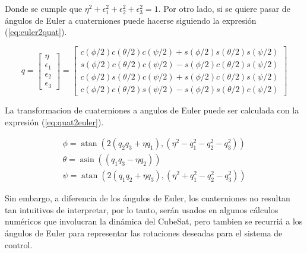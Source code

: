 Donde se cumple que $\eta^2 + \epsilon_1^2+ \epsilon_2^2+ \epsilon_3^2 =1 $. Por otro lado, si se quiere pasar de ángulos de Euler a cuaterniones puede hacerse siguiendo la expresión (\ref{eq:euler2quat}).

\begin{equation}
q=\left[\begin{array}{c}
	\eta \\
	\epsilon_1 \\
	\epsilon_2 \\
	\epsilon_3
\end{array}\right]=\left[\begin{array}{l}
	c(\phi / 2) c(\theta / 2) c(\psi / 2)+s(\phi / 2) s(\theta / 2) s(\psi / 2) \\
	s(\phi / 2) c(\theta / 2) c(\psi / 2)-s(\phi / 2) c(\theta / 2) s(\psi / 2) \\
	c(\phi / 2) s(\theta / 2) c(\psi / 2)+s(\phi / 2) c(\theta / 2) s(\psi / 2) \\
	c(\phi / 2) c(\theta / 2) s(\psi / 2)-s(\phi / 2) s(\theta / 2) c(\psi / 2)
\end{array}\right]\label{eq:euler2quat}
\end{equation}


La transformacion de cuaterniones a angulos de Euler puede ser calculada con la expresión (\ref{eq:quat2euler}).

\begin{equation}
	\begin{gathered}
		\phi=\operatorname{atan}\left(2\left(q_2 q_3+\eta q_1\right),\left(\eta^2-q_1^2-q_2^2-q_3^2\right)\right) \\
		\theta=\operatorname{asin}\left(\left(q_1 q_3-\eta q_2\right)\right) \\
		\psi=\operatorname{atan}\left(2\left(q_1 q_2+\eta q_3\right),\left(\eta^2+q_1^2-q_2^2-q_3^2\right)\right)
	\end{gathered}\label{eq:quat2euler}
\end{equation}

Sin embargo, a diferencia de los ángulos de Euler, los cuaterniones no resultan tan intuitivos de interpretar, por lo tanto, serán usados en algunos cálculos numéricos que involucran la dinámica del CubeSat, pero tambien se recurriá a los ángulos de Euler para representar las rotaciones deseadas para el sistema de control.



